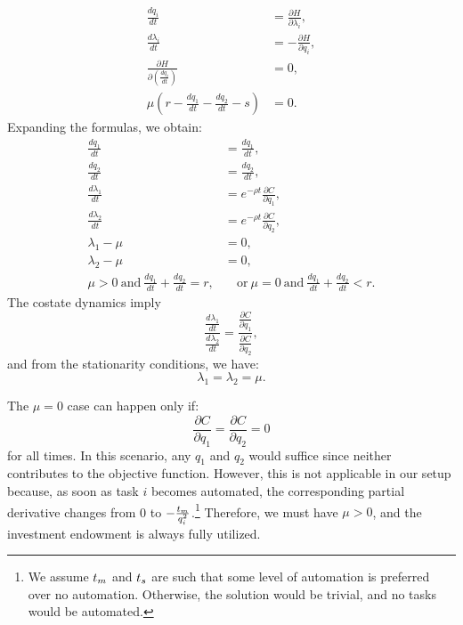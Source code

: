 \documentclass{article}
\theoremstyle{plain}
\theoremstyle{plain}
\begin{document}
\begin{align*}
\frac{dq_{i}}{dt} & =\frac{\partial H}{\partial\lambda_{i}},\tag{State Dynamics}\\[1ex]
\frac{d\lambda_{i}}{dt} & =-\frac{\partial H}{\partial q_{i}},\tag{Costate Dynamics}\\[1ex]
\frac{\partial H}{\partial\left(\frac{dq_{i}}{dt}\right)} & =0,\tag{Stationarity}\\[1ex]
\mu\left(r-\frac{dq_{1}}{dt}-\frac{dq_{2}}{dt}-s\right) & =0.\tag{Complementary Slackness}
\end{align*}
Expanding the formulas, we obtain:
\begin{align*}
\frac{dq_{1}}{dt} & =\frac{dq_{1}}{dt},\\[1ex]
\frac{dq_{2}}{dt} & =\frac{dq_{2}}{dt},\\[1ex]
\frac{d\lambda_{1}}{dt} & =e^{-\rho t}\frac{\partial C}{\partial q_{1}},\\[1ex]
\frac{d\lambda_{2}}{dt} & =e^{-\rho t}\frac{\partial C}{\partial q_{2}},\\[1ex]
\lambda_{1}-\mu & =0,\\[1ex]
\lambda_{2}-\mu & =0,\\[1ex]
\mu>0\ \text{and}\ \frac{dq_{1}}{dt}+\frac{dq_{2}}{dt}=r, & \quad \text{or}\ \mu=0\ \text{and}\ \frac{dq_{1}}{dt}+\frac{dq_{2}}{dt}<r.
\end{align*}
The costate dynamics imply
\[
\frac{\frac{d\lambda_{1}}{dt}}{\frac{d\lambda_{2}}{dt}}=\frac{\frac{\partial C}{\partial q_{1}}}{\frac{\partial C}{\partial q_{2}}},
\]
and from the stationarity conditions, we have:
\[
\lambda_{1}=\lambda_{2}=\mu.
\]

The $\mu=0$ case can happen only if:
\[
\frac{\partial C}{\partial q_{1}}=\frac{\partial C}{\partial q_{2}}=0
\]
for all times.  
In this scenario, any $q_{1}$ and $q_{2}$ would suffice since neither contributes to the objective function.  
However, this is not applicable in our setup because, as soon as task $i$ becomes automated, the corresponding partial derivative changes from 0 to $-\frac{t_{m}}{q_{i}^{2}}$.\footnote{We assume $t_{m}$ and $t_{s}$ are such that some level of automation is preferred over no automation.  
Otherwise, the solution would be trivial, and no tasks would be automated.}  
Therefore, we must have $\mu>0$, and the investment endowment is always fully utilized.
\end{document}
